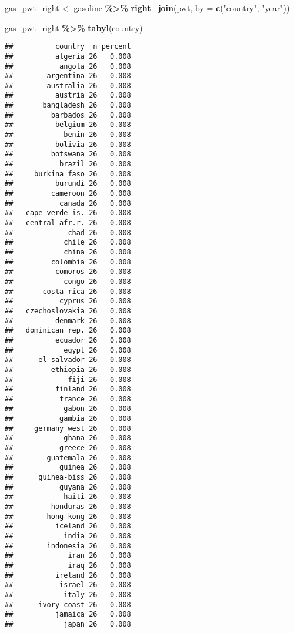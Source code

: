 \documentclass[
]{article}
\newenvironment{Shaded}{\begin{snugshade}}{\end{snugshade}}
\newcommand{\DataTypeTok}[1]{\textcolor[rgb]{0.13,0.29,0.53}{#1}}
\newcommand{\KeywordTok}[1]{\textcolor[rgb]{0.13,0.29,0.53}{\textbf{#1}}}
\newcommand{\NormalTok}[1]{#1}
\newcommand{\OperatorTok}[1]{\textcolor[rgb]{0.81,0.36,0.00}{\textbf{#1}}}
\newcommand{\StringTok}[1]{\textcolor[rgb]{0.31,0.60,0.02}{#1}}
\begin{document}
\begin{Shaded}
\begin{Highlighting}[]
\NormalTok{gas\_pwt\_right \textless{}{-}}\StringTok{ }\NormalTok{gasoline }\OperatorTok{\%\textgreater{}\%}
\StringTok{  }\KeywordTok{right\_join}\NormalTok{(pwt, }\DataTypeTok{by =} \KeywordTok{c}\NormalTok{(}\StringTok{"country"}\NormalTok{, }\StringTok{"year"}\NormalTok{))}

\NormalTok{gas\_pwt\_right }\OperatorTok{\%\textgreater{}\%}
\StringTok{  }\KeywordTok{tabyl}\NormalTok{(country)}
\end{Highlighting}
\end{Shaded}

\begin{verbatim}
##          country  n percent
##          algeria 26   0.008
##           angola 26   0.008
##        argentina 26   0.008
##        australia 26   0.008
##          austria 26   0.008
##       bangladesh 26   0.008
##         barbados 26   0.008
##          belgium 26   0.008
##            benin 26   0.008
##          bolivia 26   0.008
##         botswana 26   0.008
##           brazil 26   0.008
##     burkina faso 26   0.008
##          burundi 26   0.008
##         cameroon 26   0.008
##           canada 26   0.008
##   cape verde is. 26   0.008
##   central afr.r. 26   0.008
##             chad 26   0.008
##            chile 26   0.008
##            china 26   0.008
##         colombia 26   0.008
##          comoros 26   0.008
##            congo 26   0.008
##       costa rica 26   0.008
##           cyprus 26   0.008
##   czechoslovakia 26   0.008
##          denmark 26   0.008
##   dominican rep. 26   0.008
##          ecuador 26   0.008
##            egypt 26   0.008
##      el salvador 26   0.008
##         ethiopia 26   0.008
##             fiji 26   0.008
##          finland 26   0.008
##           france 26   0.008
##            gabon 26   0.008
##           gambia 26   0.008
##     germany west 26   0.008
##            ghana 26   0.008
##           greece 26   0.008
##        guatemala 26   0.008
##           guinea 26   0.008
##      guinea-biss 26   0.008
##           guyana 26   0.008
##            haiti 26   0.008
##         honduras 26   0.008
##        hong kong 26   0.008
##          iceland 26   0.008
##            india 26   0.008
##        indonesia 26   0.008
##             iran 26   0.008
##             iraq 26   0.008
##          ireland 26   0.008
##           israel 26   0.008
##            italy 26   0.008
##      ivory coast 26   0.008
##          jamaica 26   0.008
##            japan 26   0.008

\end{verbatim}
\end{document}
